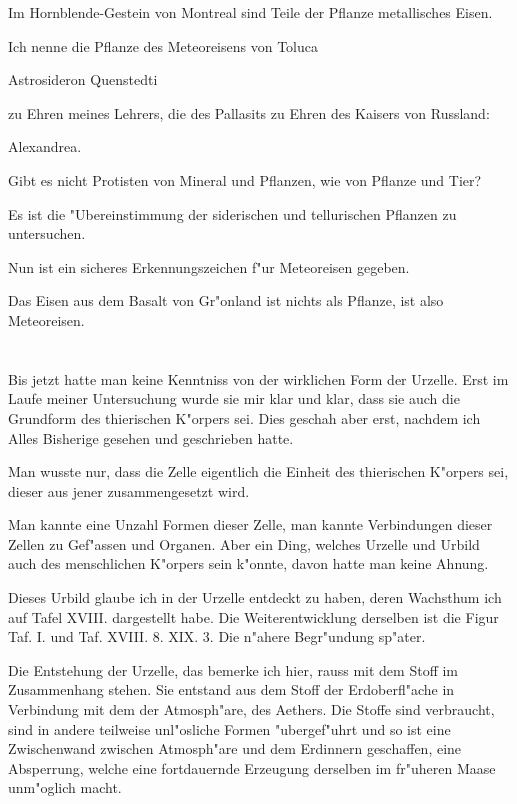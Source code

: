 \documentclass[a4paper, 11pt, oneside, german]{article}
\begin{document}
Im Hornblende-Gestein von Montreal sind Teile der Pflanze metallisches Eisen.

Ich nenne die Pflanze des Meteoreisens von Toluca

Astrosideron Quenstedti

zu Ehren meines Lehrers, die des Pallasits zu Ehren des Kaisers von Russland:

Alexandrea.

Gibt es nicht Protisten von Mineral und Pflanzen, wie von Pflanze und Tier?

Es ist die "Ubereinstimmung der siderischen und tellurischen Pflanzen zu untersuchen.

Nun ist ein sicheres Erkennungszeichen f"ur Meteoreisen gegeben.

Das Eisen aus dem Basalt von Gr"onland ist nichts als Pflanze, ist also Meteoreisen.
\clearpage
\section{}
\paragraph{}
Bis jetzt hatte man keine Kenntniss von der wirklichen Form der Urzelle. Erst im Laufe meiner Untersuchung wurde sie mir klar und klar, dass sie auch die Grundform des thierischen K"orpers sei. Dies geschah aber erst, nachdem ich Alles Bisherige gesehen und geschrieben hatte.

Man wusste nur, dass die Zelle eigentlich die Einheit des thierischen K"orpers sei, dieser aus jener zusammengesetzt wird.

Man kannte eine Unzahl Formen dieser Zelle, man kannte Verbindungen dieser Zellen zu Gef"assen und Organen. Aber ein Ding, welches Urzelle und Urbild auch des menschlichen K"orpers sein k"onnte, davon hatte man keine Ahnung.

Dieses Urbild glaube ich in der Urzelle entdeckt zu haben, deren Wachsthum ich auf Tafel XVIII. dargestellt habe. Die Weiterentwicklung derselben ist die Figur Taf. I. und Taf. XVIII. 8. XIX. 3. Die n"ahere Begr"undung sp"ater.

Die Entstehung der Urzelle, das bemerke ich hier, rauss mit dem Stoff im Zusammenhang stehen. Sie entstand aus dem Stoff der Erdoberfl"ache in Verbindung mit dem der Atmosph"are, des Aethers. Die Stoffe sind verbraucht, sind in andere teilweise unl"osliche Formen "ubergef"uhrt und so ist eine Zwischenwand zwischen Atmosph"are und dem Erdinnern geschaffen, eine Absperrung, welche eine fortdauernde Erzeugung derselben im fr"uheren Maase unm"oglich macht.
\end{document}
